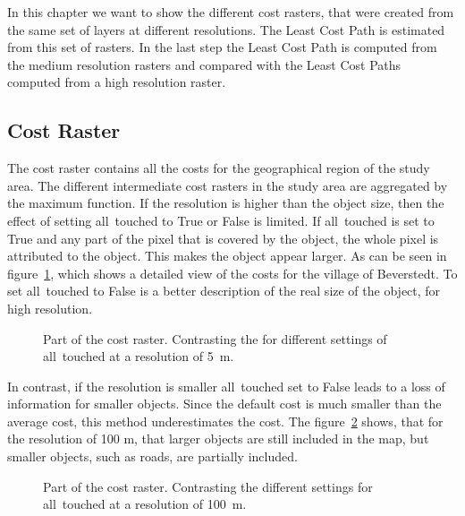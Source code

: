 
In this chapter we want to show the different cost rasters, that were created from the same set of layers at different resolutions.
The Least Cost Path is estimated from this set of rasters.
In the last step the Least Cost Path is computed from the medium resolution rasters and compared with the Least Cost Paths computed from a high resolution raster.

\subsection{Cost Raster}\label{subsec:cost-raster}

The cost raster contains all the costs for the geographical region of the study area.
The different intermediate cost rasters in the study area are aggregated by the maximum function.
If the resolution is higher than the object size, then the effect of setting all~touched to True or False is limited.
If all~touched is set to True and any part of the pixel that is covered by the object, the whole pixel is attributed to the object.
This makes the object appear larger.
As can be seen in figure~\ref{fig:costs_5m}, which shows a detailed view of the costs for the village of Beverstedt.
To set all~touched to False is a better description of the real size of the object, for high resolution.

\begin{figure}
	\centering

	\qquad
	\caption{Part of the cost raster. Contrasting the for different settings of all~touched at a resolution of 5~m.}
	\label{fig:costs_5m}
\end{figure}

In contrast, if the resolution is smaller all~touched set to False leads to a loss of information for smaller objects.
Since the default cost is much smaller than the average cost, this method underestimates the cost.
The figure~\ref{fig:costs_100m} shows, that for the resolution of 100 m, that larger objects are still included in the map, but smaller objects, such as roads, are partially included.
\begin{figure}
	\centering

	\qquad
	\caption{Part of the cost raster. Contrasting the different settings for all~touched at a resolution of 100~m.}
	\label{fig:costs_100m}
\end{figure}


